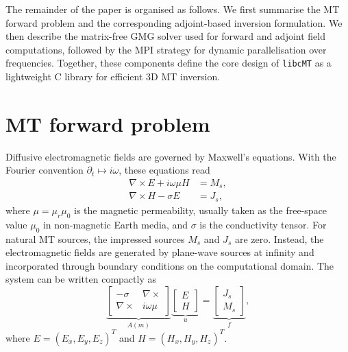 \documentclass{article}
\begin{document}
The remainder of the paper is organised as follows. We first summarise the MT forward problem and the corresponding adjoint-based inversion formulation. We then describe the matrix-free GMG solver used for forward and adjoint field computations, followed by the MPI strategy for dynamic parallelisation over frequencies. Together, these components define the core design of \texttt{libcMT} as a lightweight C library for efficient 3D MT inversion.

\section{MT forward problem}

Diffusive electromagnetic fields are governed by Maxwell's equations. With the Fourier convention $\partial_t\mapsto i\omega$, these equations read
\begin{subequations}
  \begin{align}
    \nabla\times E + i\omega\mu H &= M_s,\label{eq:H}\\
    \nabla\times H -\sigma E &= J_s, \label{eq:E}
  \end{align}
\end{subequations}
where $\mu=\mu_r\mu_0$ is the magnetic permeability, usually taken as the free-space value $\mu_0$ in non-magnetic Earth media, and $\sigma$ is the conductivity tensor. For natural MT sources, the impressed sources $M_s$ and $J_s$ are zero. Instead, the electromagnetic fields are generated by plane-wave sources at infinity and incorporated through boundary conditions on the computational domain. The system can be written compactly as
\begin{equation}
\underbrace{  \begin{bmatrix}
    -\sigma & \nabla\times\\
    \nabla\times & i\omega\mu
  \end{bmatrix}}_{A(m)}\underbrace{\begin{bmatrix}
    E\\
    H
  \end{bmatrix}}_u =\underbrace{\begin{bmatrix}
    J_s\\
    M_s
  \end{bmatrix}}_f,
\end{equation}
where $E=(E_x,E_y,E_z)^T$ and $H=(H_x,H_y,H_z)^T$.
\end{document}
